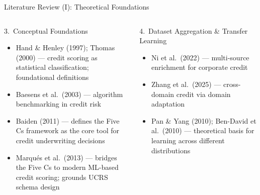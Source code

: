 \documentclass[9pt,aspectratio=169]{beamer}
\begin{document}
\begin{frame}{Literature Review (I): Theoretical Foundations}
\begin{columns}[T]
    \begin{block}{3.\ Conceptual Foundations}
      \footnotesize
      \begin{itemize}\setlength\itemsep{2pt}
        \item Hand \& Henley (1997); Thomas (2000) --- credit scoring as
              statistical classification; foundational definitions
        \item Baesens et al.\ (2003) --- algorithm benchmarking in credit risk
        \item Baiden (2011) --- defines the Five Cs framework as the core
              tool for credit underwriting decisions
        \item Marqu\'{e}s et al.\ (2013) --- bridges the Five Cs to modern
              ML-based credit scoring; grounds UCRS schema design
      \end{itemize}
    \end{block}
    \vspace{5pt}
    \begin{block}{4.\ Dataset Aggregation \& Transfer Learning}
      \footnotesize
      \begin{itemize}\setlength\itemsep{2pt}
        \item Ni et al.\ (2022) --- multi-source enrichment for corporate credit
        \item Zhang et al.\ (2025) --- cross-domain credit via domain adaptation
        \item Pan \& Yang (2010); Ben-David et al.\ (2010) --- theoretical basis
              for learning across different distributions
      \end{itemize}
    \end{block}
\end{columns}
\end{frame}
\end{document}
